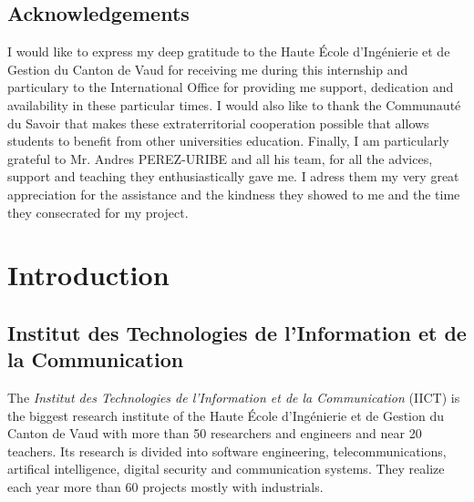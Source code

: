 \documentclass[12pt, a4paper]{report}
\begin{document}
	\makeutbmfrontcover{}

	{
	\hypersetup{linkcolor=black}
	\tableofcontents{}
	}
	
	\printglossary
	
	\newpage
	\section*{Acknowledgements}
	I would like to express my deep gratitude to the Haute École d'Ingénierie et de Gestion du Canton de Vaud for receiving me during this internship and particulary to the International Office for providing me support, dedication and availability in these particular times.
	I would also like to thank the Communauté du Savoir that makes these extraterritorial cooperation possible that allows students to benefit from other universities education.
	Finally, I am particularly grateful to Mr. Andres PEREZ-URIBE and all his team, for all the advices, support and teaching they enthusiastically gave me.
	I adress them my very great appreciation for the assistance and the kindness they showed to me and the time they consecrated for my project.

	
	\chapter{Introduction}
	\section{Institut des Technologies de l’Information et de la Communication}
	The {\itshape Institut des Technologies de l’Information et de la Communication} (IICT) is the biggest research institute of the Haute École d'Ingénierie et de Gestion du Canton de Vaud with more than 50 researchers and engineers and near 20 teachers.
	Its research is divided into software engineering, telecommunications, artifical intelligence, digital security and communication systems.
	They realize each year more than 60 projects mostly with industrials.\\
	
\end{document}
